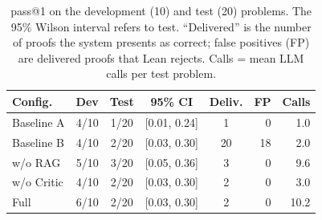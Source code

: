 \begin{table}[t]
\centering
\caption{pass@1 on the development (10) and test (20) problems. The 95\% Wilson interval refers to test. ``Delivered'' is the number of proofs the system presents as correct; false positives (FP) are delivered proofs that Lean rejects. Calls = mean LLM calls per test problem.}
\label{tab:main}
\footnotesize
\setlength{\tabcolsep}{3pt}
\begin{tabular}{lccccrr}
\hline
Config. & Dev & Test & 95\% CI & Deliv. & FP & Calls \\
\hline
Baseline A & 4/10 & 1/20 & [0.01, 0.24] & 1 & 0 & 1.0 \\
Baseline B & 4/10 & 2/20 & [0.03, 0.30] & 20 & 18 & 2.0 \\
w/o RAG & 5/10 & 3/20 & [0.05, 0.36] & 3 & 0 & 9.6 \\
w/o Critic & 4/10 & 2/20 & [0.03, 0.30] & 2 & 0 & 3.0 \\
Full & 6/10 & 2/20 & [0.03, 0.30] & 2 & 0 & 10.2 \\
\hline
\end{tabular}
\end{table}
